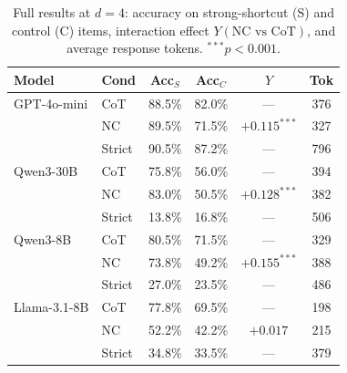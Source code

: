 \begin{table}[t]
\centering
\caption{Full results at $d{=}4$: accuracy on strong-shortcut (S) and control (C) items, interaction effect $Y(\text{NC vs CoT})$, and average response tokens. $^{***}p<0.001$.}
\label{tab:full_results}
\small
\begin{tabular}{ll cccc}
\toprule
Model & Cond & Acc$_S$ & Acc$_C$ & $Y$ & Tok \\
\midrule
GPT-4o-mini & CoT    & 88.5\% & 82.0\% & ---              & 376 \\
            & NC     & 89.5\% & 71.5\% & $+0.115^{***}$   & 327 \\
            & Strict & 90.5\% & 87.2\% & ---              & 796 \\
\midrule
Qwen3-30B   & CoT    & 75.8\% & 56.0\% & ---              & 394 \\
            & NC     & 83.0\% & 50.5\% & $+0.128^{***}$   & 382 \\
            & Strict & 13.8\% & 16.8\% & ---              & 506 \\
\midrule
Qwen3-8B    & CoT    & 80.5\% & 71.5\% & ---              & 329 \\
            & NC     & 73.8\% & 49.2\% & $+0.155^{***}$   & 388 \\
            & Strict & 27.0\% & 23.5\% & ---              & 486 \\
\midrule
Llama-3.1-8B & CoT    & 77.8\% & 69.5\% & ---             & 198 \\
             & NC     & 52.2\% & 42.2\% & $+0.017$        & 215 \\
             & Strict & 34.8\% & 33.5\% & ---             & 379 \\
\bottomrule
\end{tabular}
\end{table}
